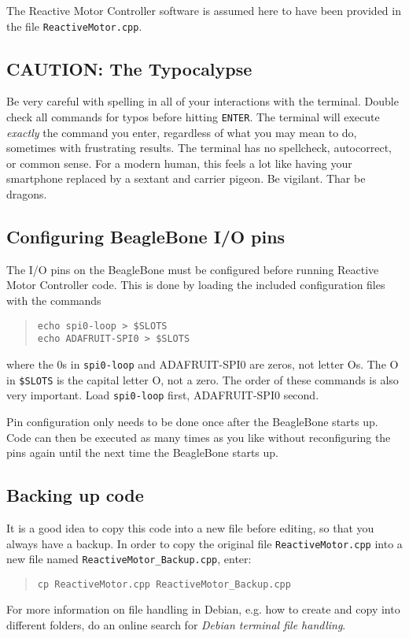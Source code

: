 \documentclass[11pt, letterpaper]{article}
\begin{document}
The Reactive Motor Controller software is assumed here to have been provided in the file \texttt{ReactiveMotor.cpp}. 

\subsection{CAUTION: The Typocalypse}
Be very careful with spelling in all of your interactions with the terminal. Double check all commands for typos before hitting \texttt{ENTER}. The terminal will execute \emph{exactly} the command you enter, regardless of what you may mean to do, sometimes with frustrating results. The terminal has no spellcheck, autocorrect, or common sense. For a modern human, this feels a lot like having your smartphone replaced by a sextant and carrier pigeon. Be vigilant. Thar be dragons.

\subsection{Configuring BeagleBone I/O pins}
The I/O pins on the BeagleBone must be configured before running Reactive Motor Controller code. This is done by loading the included configuration files with the commands
\begin{quote}
	\texttt{echo spi0-loop > \$SLOTS}\\
	\texttt{echo ADAFRUIT-SPI0 > \$SLOTS}
\end{quote}
where the 0s in \texttt{spi0-loop} and {ADAFRUIT-SPI0} are zeros, not letter Os. The O in \texttt{\$SLOTS} is the capital letter O, not a zero. The order of these commands is also very important. Load \texttt{spi0-loop} first, {ADAFRUIT-SPI0} second.

Pin configuration only needs to be done once after the BeagleBone starts up. Code can then be executed as many times as you like without reconfiguring the pins again until the next time the BeagleBone starts up.

\subsection{Backing up code}
It is a good idea to copy this code into a new file before editing, so that you always have a backup. 
In order to copy the original file \texttt{ReactiveMotor.cpp} into a new file named \texttt{ReactiveMotor\_Backup.cpp}, enter:
\begin{quote}
	\texttt{cp ReactiveMotor.cpp ReactiveMotor\_Backup.cpp}
\end{quote}
For more information on file handling in Debian, e.g. how to create and copy into different folders, do an online search for \emph{Debian terminal file handling}.
\end{document}
